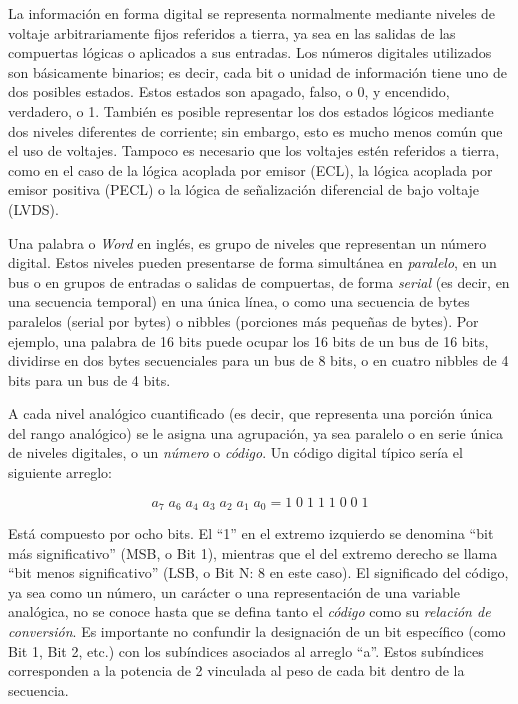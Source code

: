     La información en forma digital se representa normalmente mediante niveles de voltaje arbitrariamente fijos referidos a tierra, ya sea en las salidas de las compuertas lógicas o aplicados a sus entradas. Los números digitales utilizados son básicamente binarios; es decir, cada bit o unidad de información tiene uno de dos posibles estados. Estos estados son apagado, falso, o 0, y encendido, verdadero, o 1. También es posible representar los dos estados lógicos mediante dos niveles diferentes de corriente; sin embargo, esto es mucho menos común que el uso de voltajes. Tampoco es necesario que los voltajes estén referidos a tierra, como en el caso de la lógica acoplada por emisor (ECL), la lógica acoplada por emisor positiva (PECL) o la lógica de señalización diferencial de bajo voltaje (LVDS).

    Una palabra o \textit{Word} en inglés, es grupo de niveles que representan un número digital. Estos niveles pueden presentarse de forma simultánea en \textit{paralelo}, en un bus o en grupos de entradas o salidas de compuertas, de forma \textit{serial} (es decir, en una secuencia temporal) en una única línea, o como una secuencia de bytes paralelos (serial por bytes) o nibbles (porciones más pequeñas de bytes). Por ejemplo, una palabra de 16 bits puede ocupar los 16 bits de un bus de 16 bits, dividirse en dos bytes secuenciales para un bus de 8 bits, o en cuatro nibbles de 4 bits para un bus de 4 bits.

    A cada nivel analógico cuantificado (es decir, que representa una porción única del rango analógico) se le asigna una agrupación, ya sea paralelo o en serie única de niveles digitales, o un \textit{número} o \textit{código}. Un código digital típico sería el siguiente arreglo:

    \begin{equation}
      a_{7} \; a_{6} \; a_{4} \; a_{3} \; a_{2} \; a_{1} \; a_{0} = 1 \; 0 \; 1 \; 1 \; 1 \; 0 \; 0 \; 1
    \end{equation}

    Está compuesto por ocho bits. El ``1'' en el extremo izquierdo se denomina ``bit más significativo'' (MSB, o Bit 1), mientras que el del extremo derecho se llama ``bit menos significativo'' (LSB, o Bit N: 8 en este caso). El significado del código, ya sea como un número, un carácter o una representación de una variable analógica, no se conoce hasta que se defina tanto el \textit{código} como su \textit{relación de conversión}. Es importante no confundir la designación de un bit específico (como Bit 1, Bit 2, etc.) con los subíndices asociados al arreglo ``a''. Estos subíndices corresponden a la potencia de 2 vinculada al peso de cada bit dentro de la secuencia.

